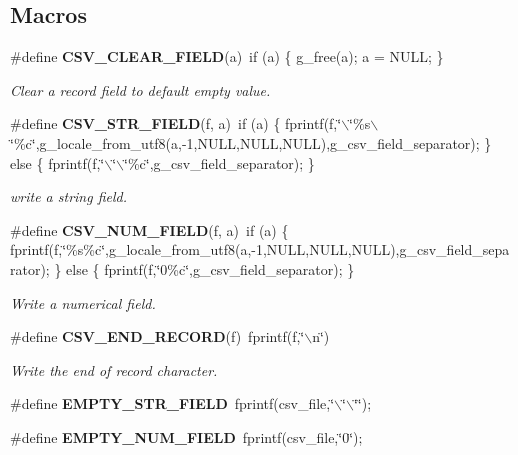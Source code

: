 \subsection*{Macros}
\begin{DoxyCompactItemize}
\item 
\#define {\bf CSV\_\-CLEAR\_\-FIELD}(a)~if (a) \{ g\_\-free(a);  a = NULL; \}
\begin{DoxyCompactList}\small\item\em Clear a record field to default empty value. \item\end{DoxyCompactList}\item 
\#define {\bf CSV\_\-STR\_\-FIELD}(f, a)~if (a) \{ fprintf(f,\char`\"{}$\backslash$\char`\"{}\%s$\backslash$\char`\"{}\%c\char`\"{},g\_\-locale\_\-from\_\-utf8(a,-\/1,NULL,NULL,NULL),g\_\-csv\_\-field\_\-separator); \} else \{ fprintf(f,\char`\"{}$\backslash$\char`\"{}$\backslash$\char`\"{}\%c\char`\"{},g\_\-csv\_\-field\_\-separator); \}
\begin{DoxyCompactList}\small\item\em write a string field. \item\end{DoxyCompactList}\item 
\#define {\bf CSV\_\-NUM\_\-FIELD}(f, a)~if (a) \{ fprintf(f,\char`\"{}\%s\%c\char`\"{},g\_\-locale\_\-from\_\-utf8(a,-\/1,NULL,NULL,NULL),g\_\-csv\_\-field\_\-separator); \} else \{ fprintf(f,\char`\"{}0\%c\char`\"{},g\_\-csv\_\-field\_\-separator); \}
\begin{DoxyCompactList}\small\item\em Write a numerical field. \item\end{DoxyCompactList}\item 
\#define {\bf CSV\_\-END\_\-RECORD}(f)~fprintf(f,\char`\"{}$\backslash$n\char`\"{})
\begin{DoxyCompactList}\small\item\em Write the end of record character. \item\end{DoxyCompactList}\item 
\#define {\bf EMPTY\_\-STR\_\-FIELD}~fprintf(csv\_\-file,\char`\"{}$\backslash$\char`\"{}$\backslash$\char`\"{}\char`\"{});
\item 
\#define {\bf EMPTY\_\-NUM\_\-FIELD}~fprintf(csv\_\-file,\char`\"{}0\char`\"{});
\end{DoxyCompactItemize}
